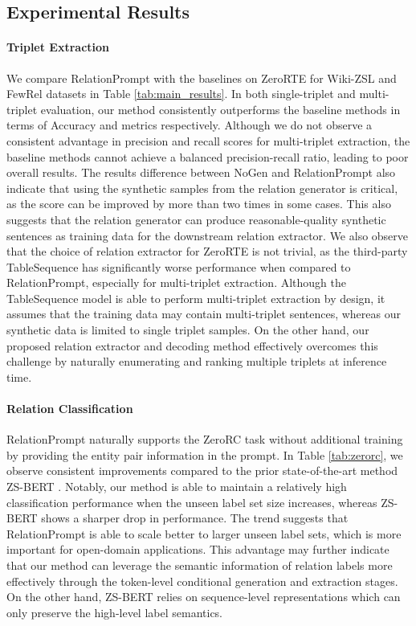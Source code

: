 \documentclass[11pt]{article}
\begin{document}
 
\subsection{Experimental Results}

\paragraph{Triplet Extraction}
We compare RelationPrompt with the baselines on ZeroRTE for Wiki-ZSL and FewRel datasets in Table \ref{tab:main_results}.
In both single-triplet and multi-triplet evaluation, our method consistently outperforms the baseline methods in terms of Accuracy and  metrics respectively.
Although we do not observe a consistent advantage in precision and recall scores for multi-triplet extraction, the baseline methods cannot achieve a balanced precision-recall ratio, leading to poor overall  results.
The results difference between NoGen and RelationPrompt also indicate that using the synthetic samples from the relation generator is critical, as the  score can be improved by more than two times in some cases.
This also suggests that the relation generator can produce reasonable-quality synthetic sentences as training data for the downstream relation extractor.
We also observe that the choice of relation extractor for ZeroRTE is not trivial, as the third-party TableSequence \cite{wang2020two} has significantly worse performance when compared to RelationPrompt, especially for multi-triplet extraction.
Although the TableSequence model is able to perform multi-triplet extraction by design, it assumes that the training data may contain multi-triplet sentences, whereas our synthetic data is limited to single triplet samples.
On the other hand, our proposed relation extractor and decoding method effectively overcomes this challenge by naturally enumerating and ranking multiple triplets at inference time. 


\paragraph{Relation Classification} 
RelationPrompt naturally supports
the ZeroRC task without additional training by providing the entity pair information in the prompt.
In Table \ref{tab:zerorc}, we observe consistent improvements compared to the prior state-of-the-art method ZS-BERT \cite{chen2021zs}.
Notably, our method is able to maintain a relatively high classification  performance when the unseen label set size  increases, whereas ZS-BERT shows a sharper drop in performance.
The trend suggests that RelationPrompt is able to scale better to larger unseen label sets, which is more important for open-domain applications.
This advantage may further indicate that our method can leverage the semantic information of relation labels more effectively through the token-level conditional generation and extraction stages. 
On the other hand, ZS-BERT relies on sequence-level representations which can only preserve the high-level label semantics.
\end{document}
